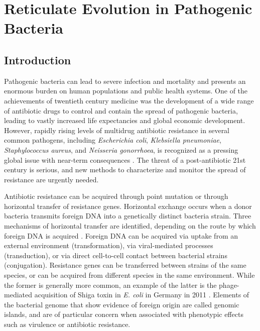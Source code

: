 \chapter{Reticulate Evolution in Pathogenic Bacteria}
\label{ch:pathogens}

\section{Introduction}
\label{sec:pathogen_introduction}

Pathogenic bacteria can lead to severe infection and mortality and presents an enormous burden on human populations and public health systems.
One of the achievements of twentieth century medicine was the development of a wide range of antibiotic drugs to control and contain the spread of pathogenic bacteria, leading to vastly increased life expectancies and global economic development.
However, rapidly rising levels of multidrug antibiotic resistance in several common pathogens, including \emph{Escherichia coli}, \emph{Klebsiella pneumoniae}, \emph{Staphylococcus aureus}, and \emph{Neisseria gonorrhoea}, is recognized as a pressing global issue with near-term consequences \cite{Neu:1992gk,Thomas:2005hp,WHO:2014wa}.
The threat of a post-antibiotic 21st century is serious, and new methods to characterize and monitor the spread of resistance are urgently needed.

Antibiotic resistance can be acquired through point mutation or through horizontal transfer of resistance genes.
Horizontal exchange occurs when a donor bacteria transmits foreign DNA into a genetically distinct bacteria strain.
Three mechanisms of horizontal transfer are identified, depending on the route by which foreign DNA is acquired \cite{Ochman:2000dr}.
Foreign DNA can be acquired via uptake from an external environment (transformation), via viral-mediated processes (transduction), or via direct cell-to-cell contact between bacterial strains (conjugation).
Resistance genes can be transferred between strains of the same species, or can be acquired from different species in the same environment.
While the former is generally more common, an example of the latter is the phage-mediated acquisition of Shiga toxin in \emph{E. coli} in Germany in 2011 \cite{Rohde:2011ju}.
Elements of the bacterial genome that show evidence of foreign origin are called genomic islands, and are of particular concern when associated with phenotypic effects such as virulence or antibiotic resistance.

